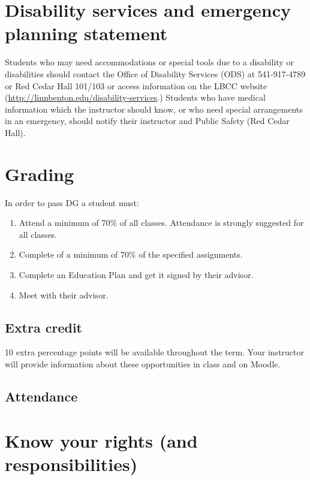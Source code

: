 \documentclass[12pt,article,oneside]{memoir}
\begin{document}
\section{Disability services and emergency planning statement}

Students who may need accommodations or special tools due to a disability or disabilities should contact the Office of Disability Services (ODS) at 541-917-4789 or Red Cedar Hall 101/103 or access information on the LBCC website (\url{http://linnbenton.edu/disability-services}.) Students who have medical information which the instructor should know, or who need special arrangements in an emergency, should notify their instructor and Public Safety (Red Cedar Hall).

\section{Grading}

In order to pass DG a student must:

\begin{enumerate}
 \item Attend a minimum of 70\% of all classes.  Attendance is strongly suggested for all classes.
 \item Complete of a minimum of 70\% of the specified assignments.
 \item Complete an Education Plan and get it signed by their advisor.
 \item Meet with their advisor.
\end{enumerate}
  

\subsection{Extra credit}
10 extra percentage points will be available throughout the term.  Your instructor will provide information about these opportunities in class and on Moodle.


\subsection{Attendance}


\section{Know your rights (and responsibilities)}
\end{document}
